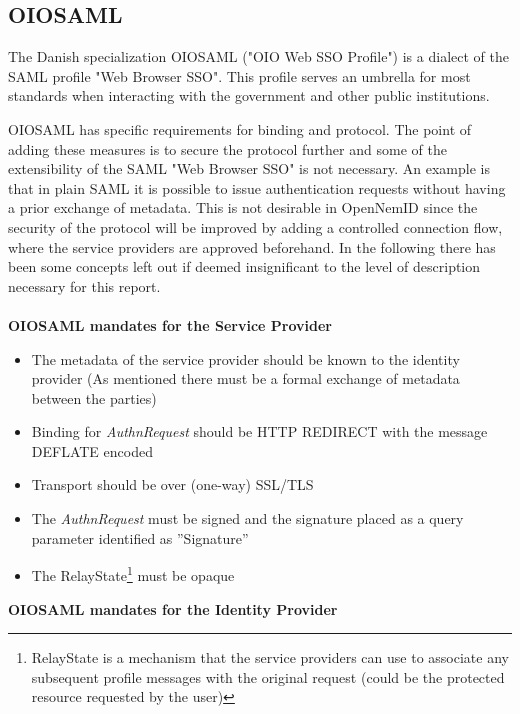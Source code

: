 \documentclass[twosided]{report}
\begin{document}
\subsection{OIOSAML}
The Danish specialization OIOSAML ("OIO Web SSO Profile") is a dialect of the SAML profile "Web Browser SSO". This profile serves an umbrella for most standards when interacting with the government and other public institutions.
\par
OIOSAML has specific requirements for binding and protocol. The point of adding these measures is to secure the protocol further and some of the extensibility of the SAML "Web Browser SSO" is not necessary. An example is that in plain SAML it is possible to issue authentication requests without having a prior exchange of metadata. This is not desirable in OpenNemID since the security of the protocol will be improved by adding a controlled connection flow, where the service providers are approved beforehand. In the following there has been some concepts left out if deemed insignificant to the level of description necessary for this report.\\\\
\textbf{OIOSAML mandates for the Service Provider}
\begin{itemize}
  \item The metadata of the service provider should be known to the identity provider (As mentioned there must be a formal exchange of metadata between the parties)
  \item Binding for \emph{AuthnRequest} should be HTTP REDIRECT with the message DEFLATE encoded
  \item Transport should be over (one-way) SSL/TLS
  \item The \emph{AuthnRequest} must be signed and the signature placed as a query parameter identified as ''Signature''
  \item The RelayState\footnote{RelayState is a mechanism that the service providers can use to associate any subsequent profile messages with the original request (could be the protected resource requested by the user)} must be opaque
\end{itemize}
\textbf{OIOSAML mandates for the Identity Provider}
\end{document}
